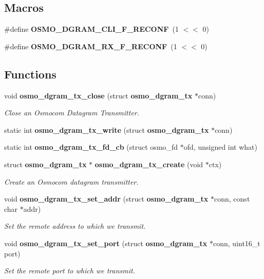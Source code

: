\subsection*{Macros}
\begin{DoxyCompactItemize}
\item 
\#define {\bfseries O\+S\+M\+O\+\_\+\+D\+G\+R\+A\+M\+\_\+\+C\+L\+I\+\_\+\+F\+\_\+\+R\+E\+C\+O\+NF}~(1 $<$$<$ 0)
\item 
\#define {\bfseries O\+S\+M\+O\+\_\+\+D\+G\+R\+A\+M\+\_\+\+R\+X\+\_\+\+F\+\_\+\+R\+E\+C\+O\+NF}~(1 $<$$<$ 0)
\end{DoxyCompactItemize}
\subsection*{Functions}
\begin{DoxyCompactItemize}
\item 
void {\bf osmo\+\_\+dgram\+\_\+tx\+\_\+close} (struct {\bf osmo\+\_\+dgram\+\_\+tx} $\ast$conn)
\begin{DoxyCompactList}\small\item\em Close an Osmocom Datagram Transmitter. \end{DoxyCompactList}\item 
static int {\bfseries osmo\+\_\+dgram\+\_\+tx\+\_\+write} (struct {\bf osmo\+\_\+dgram\+\_\+tx} $\ast$conn)
\item 
static int {\bfseries osmo\+\_\+dgram\+\_\+tx\+\_\+fd\+\_\+cb} (struct osmo\+\_\+fd $\ast$ofd, unsigned int what)
\item 
struct {\bf osmo\+\_\+dgram\+\_\+tx} $\ast$ {\bf osmo\+\_\+dgram\+\_\+tx\+\_\+create} (void $\ast$ctx)
\begin{DoxyCompactList}\small\item\em Create an Osmocom datagram transmitter. \end{DoxyCompactList}\item 
void {\bf osmo\+\_\+dgram\+\_\+tx\+\_\+set\+\_\+addr} (struct {\bf osmo\+\_\+dgram\+\_\+tx} $\ast$conn, const char $\ast$addr)
\begin{DoxyCompactList}\small\item\em Set the remote address to which we transmit. \end{DoxyCompactList}\item 
void {\bf osmo\+\_\+dgram\+\_\+tx\+\_\+set\+\_\+port} (struct {\bf osmo\+\_\+dgram\+\_\+tx} $\ast$conn, uint16\+\_\+t port)
\begin{DoxyCompactList}\small\item\em Set the remote port to which we transmit. \end{DoxyCompactList}\item 

\end{DoxyCompactItemize}
